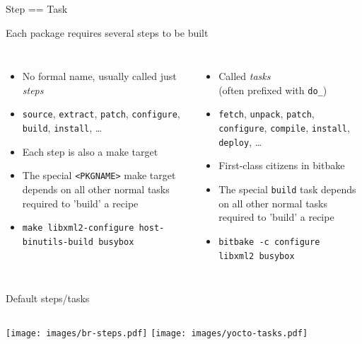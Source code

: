 \documentclass[xetex,table,aspectratio=43]{beamer}
\begin{document}
\begin{frame}{Step == Task}
  \begin{center}
    Each package requires several steps to be built
  \end{center}

  \footnotesize
  \begin{columns}
    \begin{itemize}
    \item No formal name, usually called just {\em steps}
    \item {\tt source}, {\tt extract}, {\tt patch}, {\tt configure},
      {\tt build}, {\tt install}, \dots
    \item Each step is also a make target
    \item The special {\tt <PKGNAME>} make target depends on all other normal
      tasks required to 'build' a recipe
    \item {\tt make libxml2-configure host-binutils-build busybox}
    \end{itemize}

    \begin{itemize}
    \item Called {\em tasks}\\
      (often prefixed with {\tt do\_})
    \item {\tt fetch}, {\tt unpack}, {\tt patch}, {\tt configure},
      {\tt compile}, {\tt install}, {\tt deploy}, \dots
    \item First-class citizens in bitbake
    \item The special {\tt build} task depends on all other normal
      tasks required to 'build' a recipe
    \item {\tt bitbake -c configure\\
      libxml2 busybox}
    \end{itemize}
  \end{columns}
\end{frame}

\begin{frame}{Default steps/tasks}
  \begin{columns}
    \center\texttt{[image: images/br-steps.pdf]}
    \center\texttt{[image: images/yocto-tasks.pdf]}
  \end{columns}
\end{frame}
\end{document}
